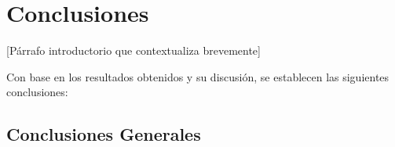 %
%
%

\chapter{Conclusiones}
\label{cap:conclusiones}


[Párrafo introductorio que contextualiza brevemente]

Con base en los resultados obtenidos y su discusión, se establecen las siguientes conclusiones:

\section{Conclusiones Generales}
\label{sec:conclusiones_generales}

